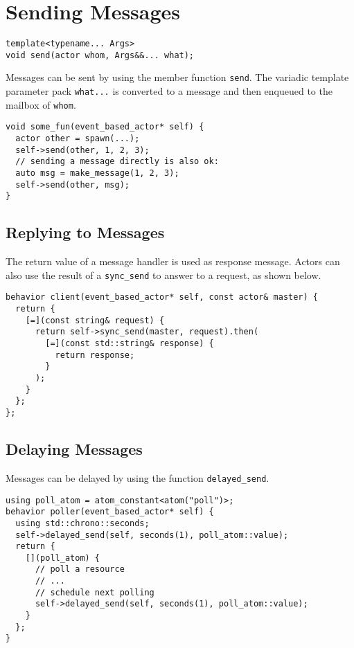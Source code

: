 \section{Sending Messages}
\label{Sec::Send}

\begin{lstlisting}
template<typename... Args>
void send(actor whom, Args&&... what);
\end{lstlisting}

Messages can be sent by using the member function \lstinline^send^.
The variadic template parameter pack \lstinline^what...^ is converted to a message and then enqueued to the mailbox of \lstinline^whom^.

\begin{lstlisting}
void some_fun(event_based_actor* self) {
  actor other = spawn(...);
  self->send(other, 1, 2, 3);
  // sending a message directly is also ok:
  auto msg = make_message(1, 2, 3);
  self->send(other, msg);
}
\end{lstlisting}

\subsection{Replying to Messages}
\label{Sec::Send::Reply}

The return value of a message handler is used as response message.
Actors can also use the result of a \lstinline^sync_send^ to answer to a request, as shown below.

\begin{lstlisting}
behavior client(event_based_actor* self, const actor& master) {
  return {
    [=](const string& request) {
      return self->sync_send(master, request).then(
        [=](const std::string& response) {
          return response;
        }
      );
    }
  };
};
\end{lstlisting}

\subsection{Delaying Messages}

Messages can be delayed by using the function \lstinline^delayed_send^.

\begin{lstlisting}
using poll_atom = atom_constant<atom("poll")>;
behavior poller(event_based_actor* self) {
  using std::chrono::seconds;
  self->delayed_send(self, seconds(1), poll_atom::value);
  return {
    [](poll_atom) {
      // poll a resource
      // ...
      // schedule next polling
      self->delayed_send(self, seconds(1), poll_atom::value);
    }
  };
}
\end{lstlisting}

